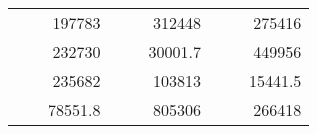 \begin{table}[H]
\begin{tabular}{|ccrccrccc}
\rowcolor[HTML]{DAE8FC} 
\multicolumn{1}{|c|}{\cellcolor[HTML]{FFFFC7}}                                & \multicolumn{1}{c|}{\cellcolor[HTML]{DAE8FC}}                      & \multicolumn{1}{r|}{\cellcolor[HTML]{DAE8FC}197783}    & \multicolumn{1}{c|}{\cellcolor[HTML]{FFFFC7}}                                & \multicolumn{1}{c|}{\cellcolor[HTML]{DAE8FC}}                       & \multicolumn{1}{r|}{\cellcolor[HTML]{DAE8FC}312448}    & \multicolumn{1}{c|}{\cellcolor[HTML]{FFFFC7}}                                & \multicolumn{1}{c|}{\cellcolor[HTML]{DAE8FC}}                      & \multicolumn{1}{r|}{\cellcolor[HTML]{DAE8FC}275416}    \\ \cline{3-3} \cline{6-6} \cline{9-9} 
\multicolumn{1}{|c|}{\cellcolor[HTML]{FFFFC7}}                                & \multicolumn{1}{c|}{\cellcolor[HTML]{DAE8FC}}                      & \multicolumn{1}{r|}{\cellcolor[HTML]{DDFDFF}232730}    & \multicolumn{1}{c|}{\cellcolor[HTML]{FFFFC7}}                                & \multicolumn{1}{c|}{\cellcolor[HTML]{DAE8FC}}                       & \multicolumn{1}{r|}{\cellcolor[HTML]{DDFDFF}30001.7}   & \multicolumn{1}{c|}{\cellcolor[HTML]{FFFFC7}}                                & \multicolumn{1}{c|}{\cellcolor[HTML]{DAE8FC}}                      & \multicolumn{1}{r|}{\cellcolor[HTML]{DDFDFF}449956}    \\ \cline{3-3} \cline{6-6} \cline{9-9} 
\rowcolor[HTML]{DAE8FC} 
\multicolumn{1}{|c|}{\cellcolor[HTML]{FFFFC7}}                                & \multicolumn{1}{c|}{\cellcolor[HTML]{DAE8FC}}                      & \multicolumn{1}{r|}{\cellcolor[HTML]{DAE8FC}235682}    & \multicolumn{1}{c|}{\cellcolor[HTML]{FFFFC7}}                                & \multicolumn{1}{c|}{\cellcolor[HTML]{DAE8FC}}                       & \multicolumn{1}{r|}{\cellcolor[HTML]{DAE8FC}103813}    & \multicolumn{1}{c|}{\cellcolor[HTML]{FFFFC7}}                                & \multicolumn{1}{c|}{\cellcolor[HTML]{DAE8FC}}                      & \multicolumn{1}{r|}{\cellcolor[HTML]{DAE8FC}15441.5}   \\ \cline{3-3} \cline{6-6} \cline{9-9} 
\multicolumn{1}{|c|}{\cellcolor[HTML]{FFFFC7}}                                & \multicolumn{1}{c|}{\cellcolor[HTML]{DAE8FC}}                      & \multicolumn{1}{r|}{\cellcolor[HTML]{DDFDFF}78551.8}   & \multicolumn{1}{c|}{\cellcolor[HTML]{FFFFC7}}                                & \multicolumn{1}{c|}{\cellcolor[HTML]{DAE8FC}}                       & \multicolumn{1}{r|}{\cellcolor[HTML]{DDFDFF}805306}    & \multicolumn{1}{c|}{\cellcolor[HTML]{FFFFC7}}                                & \multicolumn{1}{c|}{\cellcolor[HTML]{DAE8FC}}                      & \multicolumn{1}{r|}{\cellcolor[HTML]{DDFDFF}266418}    \\ \cline{3-3} \cline{6-6} \cline{9-9} 

\end{tabular}
\end{table}
